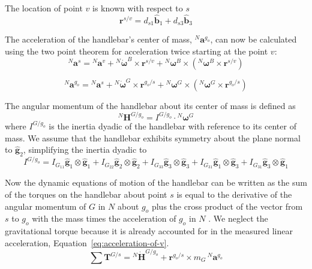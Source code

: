 \documentclass[10pt]{article}
\begin{document}
The location of point $v$ is known with respect to $s$
%
\begin{equation}
  \mathbf{r}^{s/v} = d_{s1}\hat{\mathbf{b}}_1 + d_{s3}\hat{\mathbf{b}}_3
\end{equation}

The acceleration of the handlebar's center of mass, $^N\mathbf{a}^{g_o}$, can
now be calculated using the two point theorem for acceleration \cite{Kane1985}
twice starting at the point $v$:
%
\begin{equation}
  ^N\mathbf{a}^s = {}^N\mathbf{a}^v +
    {}^N\dot{\boldsymbol{\omega}}^B\times\mathbf{r}^{s/v} +
    {}^N\boldsymbol{\omega}^B\times({}^N\boldsymbol{\omega}^B\times\mathbf{r}^{s/v})
\end{equation}

\begin{equation}
  ^N\mathbf{a}^{g_o} = {}^N\mathbf{a}^s +
    {}^N\dot{\boldsymbol{\omega}}^G\times\mathbf{r}^{g_o/s} +
    {}^N\boldsymbol{\omega}^G\times({}^N\boldsymbol{\omega}^G\times\mathbf{r}^{g_o/s})
\end{equation}

The angular momentum of the handlebar about its center of mass is defined as
%
\begin{equation}
  ^N\mathbf{H}^{G/g_o} = I^{G/g_o} \cdot {}^N\boldsymbol{\omega}^G
\end{equation}
%
where $I^{G/g_o}$ is the inertia dyadic of the handlebar with reference to its
center of mass. We assume that the handlebar exhibits symmetry about the plane
normal to $\hat{\mathbf{g}}_2$, simplifying the inertia dyadic to
%
\begin{equation}
  I^{G/g_o} =
    I_{G_{11}} \hat{\mathbf{g}}_1 \otimes \hat{\mathbf{g}}_1 +
    I_{G_{22}} \hat{\mathbf{g}}_2 \otimes \hat{\mathbf{g}}_2 +
    I_{G_{33}} \hat{\mathbf{g}}_3 \otimes \hat{\mathbf{g}}_3 +
    I_{G_{31}} \hat{\mathbf{g}}_1 \otimes \hat{\mathbf{g}}_3 +
    I_{G_{31}} \hat{\mathbf{g}}_3 \otimes \hat{\mathbf{g}}_1
\end{equation}

Now the dynamic equations of motion of the handlebar can be written as the sum
of the torques on the handlebar about point $s$ is equal to the derivative of
the angular momentum of $G$ in $N$ about $g_o$ plus the cross product of the
vector from $s$ to $g_o$ with the mass times the acceleration of $g_o$ in $N$
\cite{Meriam1975}. We neglect the gravitational torque because it is already
accounted for in the measured linear acceleration,
Equation~\ref{eq:acceleration-of-v}.
%
\begin{equation}
  \sum \mathbf{T}^{G/s} = {}^N\dot{\mathbf{H}}^{G/g_o} +
    \mathbf{r}^{g_o/s} \times m_G\,{}^N\mathbf{a}^{g_o}
\end{equation}
\end{document}
